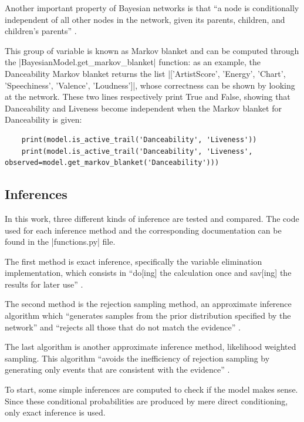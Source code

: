 \documentclass[a4paper, 12pt]{article}
\begin{document}
Another important property of Bayesian networks is that ``a node is conditionally independent of all other nodes in the network, given its parents, children, and children’s parents'' \cite{probabilistic-reasoning}.

This group of variable is known as Markov blanket and can be computed through the \spverb|BayesianModel.get_markov_blanket| function: as an example, the Danceability Markov blanket returns the list \spverb|['ArtistScore', 'Energy', 'Chart', 'Speechiness', 'Valence', 'Loudness']|, whose correctness can be shown by looking at the network. These two lines respectively print True and False, showing that Danceability and Liveness become independent when the Markov blanket for Danceability is given:
\begin{verbatim}
    print(model.is_active_trail('Danceability', 'Liveness'))
    print(model.is_active_trail('Danceability', 'Liveness', observed=model.get_markov_blanket('Danceability')))
\end{verbatim}


\subsection{Inferences}

In this work, three different kinds of inference are tested and compared. The code used for each inference method and the corresponding documentation can be found in the \spverb|functions.py| file.

The first method is exact inference, specifically the variable elimination implementation, which consists in ``do[ing] the calculation once and sav[ing] the results for later use'' \cite{probabilistic-reasoning}.

The second method is the rejection sampling method, an approximate inference algorithm which ``generates samples from the prior distribution specified by the network'' \cite{probabilistic-reasoning} and ``rejects all those that do not match the evidence'' \cite{probabilistic-reasoning}.

The last algorithm is another approximate inference method, likelihood weighted sampling. This algorithm ``avoids the inefficiency of rejection sampling by generating only events that are consistent with the evidence'' \cite{probabilistic-reasoning}.

To start, some simple inferences are computed to check if the model makes sense. Since these conditional probabilities are produced by mere direct conditioning, only exact inference is used.
\end{document}
